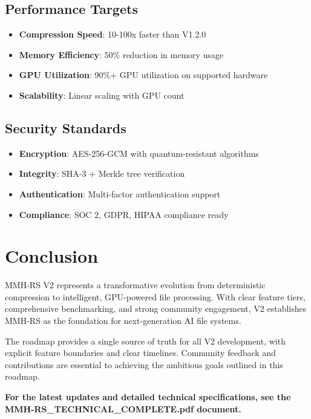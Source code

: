 \documentclass[12pt,a4paper]{article}
\begin{document}
\subsection{Performance Targets}
\begin{itemize}
    \item \textbf{Compression Speed}: 10-100x faster than V1.2.0
    \item \textbf{Memory Efficiency}: 50\% reduction in memory usage
    \item \textbf{GPU Utilization}: 90\%+ GPU utilization on supported hardware
    \item \textbf{Scalability}: Linear scaling with GPU count
\end{itemize}

\subsection{Security Standards}
\begin{itemize}
    \item \textbf{Encryption}: AES-256-GCM with quantum-resistant algorithms
    \item \textbf{Integrity}: SHA-3 + Merkle tree verification
    \item \textbf{Authentication}: Multi-factor authentication support
    \item \textbf{Compliance}: SOC 2, GDPR, HIPAA compliance ready
\end{itemize}

\section{Conclusion}

MMH-RS V2 represents a transformative evolution from deterministic compression to intelligent, GPU-powered file processing. With clear feature tiers, comprehensive benchmarking, and strong community engagement, V2 establishes MMH-RS as the foundation for next-generation AI file systems.

The roadmap provides a single source of truth for all V2 development, with explicit feature boundaries and clear timelines. Community feedback and contributions are essential to achieving the ambitious goals outlined in this roadmap.

\textbf{For the latest updates and detailed technical specifications, see the MMH-RS\_TECHNICAL\_COMPLETE.pdf document.}
\end{document}
